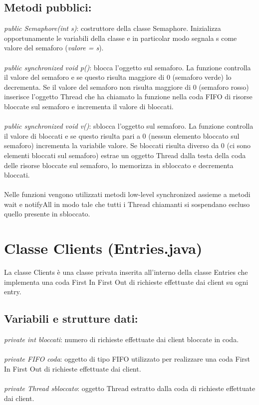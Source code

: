 \documentclass[10pt, a4paper]{article}
\begin{document}
\subsection{Metodi pubblici:}
\textit{public Semaphore(int s)}: costruttore della classe Semaphore. Inizializza opportunamente le variabili della classe e in particolar modo segnala s come valore del semaforo (\textit{valore = s}).
\\\\
\textit{public synchronized void p()}: blocca l'oggetto sul semaforo. La funzione controlla il valore del semaforo e se questo risulta maggiore di 0 (semaforo verde) lo decrementa. Se il valore del semaforo non risulta maggiore di 0 (semaforo rosso) inserisce l'oggetto Thread che ha chiamato la funzione nella coda FIFO di risorse bloccate sul semaforo e incrementa il valore di bloccati.
\\\\
\textit{public synchronized void v()}: sblocca l'oggetto sul semaforo. La funzione controlla il valore di bloccati e se questo risulta pari a 0 (nessun elemento bloccato sul semaforo) incrementa la variabile valore. Se bloccati risulta diverso da 0 (ci sono elementi bloccati sul semaforo) estrae un oggetto Thread dalla testa della coda delle risorse bloccate sul semaforo, lo memorizza in sbloccato e decrementa bloccati.
\\\\
Nelle funzioni vengono utilizzati metodi low-level synchronized assieme a metodi wait e notifyAll in modo tale che tutti i Thread chiamanti si sospendano escluso quello presente in sbloccato.
\section{Classe Clients (Entries.java)}
La classe Clients è una classe privata inserita all'interno della classe Entries che implementa una coda First In First Out di richieste effettuate dai client su ogni entry.
\subsection{Variabili e strutture dati:}
\textit{private int bloccati}: numero di richieste effettuate dai client bloccate in coda.
\\\\
\textit{private FIFO coda}: oggetto di tipo FIFO utilizzato per realizzare una coda First In First Out di richieste effettuate dai client.\\\\
\textit{private Thread sbloccato}: oggetto Thread estratto dalla coda di richieste effettuate dai client.
\end{document}
